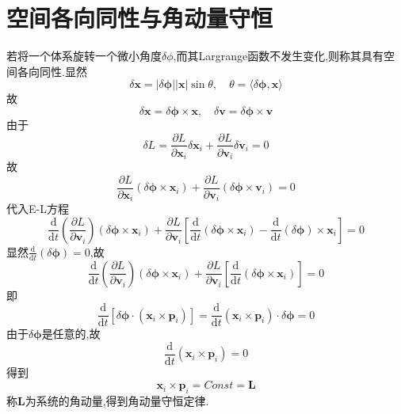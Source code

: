 \section{空间各向同性与角动量守恒}
若将一个体系旋转一个微小角度$\delta\phi$,而其Largrange函数不发生变化,则称其具有空间各向同性.显然
\begin{equation}
\delta\boldsymbol{x} = |\delta\boldsymbol{\phi}| |\boldsymbol{x}|\sin\theta,\quad 
\theta = \langle \delta\boldsymbol{\phi},\boldsymbol{x} \rangle
\end{equation}
故
\begin{equation}
\delta\boldsymbol{x} = \delta\boldsymbol{\phi} \times \boldsymbol{x},\quad 
\delta\boldsymbol{v} = \delta\boldsymbol{\phi} \times \boldsymbol{v}
\end{equation}
由于
\begin{equation}
\delta L = \frac{\partial L}{\partial\boldsymbol{x}_i}\delta\boldsymbol{x}_i + 
\frac{\partial L}{\partial\boldsymbol{v}_i}\delta\boldsymbol{v}_i = 0
\end{equation}
故
\begin{equation}
\frac{\partial L}{\partial\boldsymbol{x}_i}(\delta\boldsymbol{\phi} \times \boldsymbol{x}_i) + 
\frac{\partial L}{\partial\boldsymbol{v}_i}(\delta\boldsymbol{\phi} \times \boldsymbol{v}_i) = 0
\end{equation}
代入E-L方程
\begin{equation}
\frac{\mathrm{d}}{\mathrm{d}t} \left(\frac{\partial L}{\partial\boldsymbol{v}_i}\right)(\delta\boldsymbol{\phi} \times \boldsymbol{x}_i) + 
\frac{\partial L}{\partial\boldsymbol{v}_i}
\left[ 
\frac{\mathrm{d}}{\mathrm{d}t}(\delta\boldsymbol{\phi} \times \boldsymbol{x}_i) - 
\frac{\mathrm{d}}{\mathrm{d}t}(\delta\boldsymbol{\phi}) \times \boldsymbol{x}_i
\right] = 0
\end{equation}
显然$\frac{\mathrm{d}}{\mathrm{d}t}(\delta\boldsymbol{\phi})=0$,故
\begin{equation}
\frac{\mathrm{d}}{\mathrm{d}t} \left(\frac{\partial L}{\partial\boldsymbol{v}_i}\right)(\delta\boldsymbol{\phi} \times \boldsymbol{x}_i) + 
\frac{\partial L}{\partial\boldsymbol{v}_i}
\left[ 
\frac{\mathrm{d}}{\mathrm{d}t}(\delta\boldsymbol{\phi} \times \boldsymbol{x}_i)
\right] = 0
\end{equation}
即
\begin{equation}
\frac{\mathrm{d}}{\mathrm{d}t} [\delta\boldsymbol{\phi}\cdot(\boldsymbol{x}_i \times \boldsymbol{p}_i)] = 
\frac{\mathrm{d}}{\mathrm{d}t} (\boldsymbol{x}_i \times \boldsymbol{p}_i)\cdot\delta\boldsymbol{\phi} = 0
\end{equation}
由于$\delta\boldsymbol{\phi}$是任意的,故
\begin{equation}
\frac{\mathrm{d}}{\mathrm{d}t} (\boldsymbol{x}_i \times \boldsymbol{p}_i) = 0
\end{equation}
得到
\begin{equation}
\boldsymbol{x}_i \times \boldsymbol{p}_i = Const = \boldsymbol{L}
\end{equation}
称$\boldsymbol{L}$为系统的角动量,得到角动量守恒定律.


